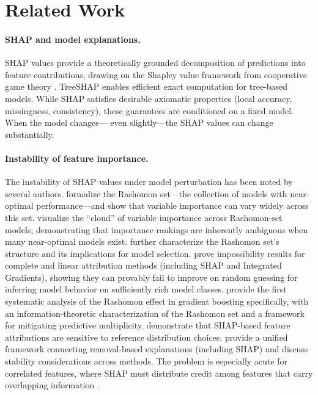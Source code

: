 \documentclass[11pt]{article}
\begin{document}
\section{Related Work}
\label{sec:related}

\paragraph{SHAP and model explanations.}
SHAP values \citep{lundberg2017unified} provide a theoretically grounded
decomposition of predictions into feature contributions, drawing on the
Shapley value framework from cooperative game theory
\citep{shapley1953value}. TreeSHAP \citep{lundberg2020local} enables
efficient exact computation for tree-based models. While SHAP satisfies
desirable axiomatic properties (local accuracy, missingness, consistency),
these guarantees are conditioned on a fixed model. When the model changes---
even slightly---the SHAP values can change substantially.

\paragraph{Instability of feature importance.}
The instability of SHAP values under model perturbation has been noted by
several authors. \citet{fisher2019all} formalize the Rashomon set---the
collection of models with near-optimal performance---and show that
variable importance can vary widely across this set.
\citet{dong2020exploring} visualize the ``cloud'' of variable importance
across Rashomon-set models, demonstrating that importance rankings are
inherently ambiguous when many near-optimal models exist.
\citet{semenova2022existence} further characterize the Rashomon set's
structure and its implications for model selection.
\citet{bilodeau2024impossibility} prove impossibility results for
complete and linear attribution methods (including SHAP and Integrated
Gradients), showing they can provably fail to improve on random guessing
for inferring model behavior on sufficiently rich model classes.
\citet{chenrashomongb2024} provide the first systematic analysis of the
Rashomon effect in gradient boosting specifically, with an
information-theoretic characterization of the Rashomon set and a framework
for mitigating predictive multiplicity.
\citet{marx2023but} demonstrate that SHAP-based feature attributions
are sensitive to reference distribution choices.
\citet{covert2021explaining} provide a unified framework connecting
removal-based explanations (including SHAP) and discuss stability
considerations across methods.
The problem is especially acute for correlated features, where SHAP must
distribute credit among features that carry overlapping information
\citep{kumar2020problems, chen2020true}.
\end{document}
